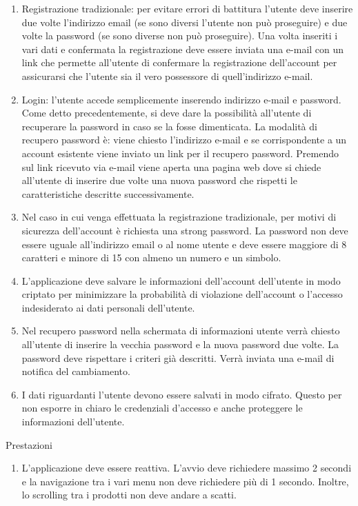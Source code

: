 \documentclass{article}
\begin{document}
\begin{enumerate}
    \item Registrazione tradizionale: per evitare errori di battitura l’utente deve inserire due volte l’indirizzo email (se sono diversi
        l’utente non può proseguire) e due volte la password (se sono diverse non può proseguire). Una volta inseriti i vari dati e confermata
        la registrazione deve essere inviata una e-mail con un link che permette all’utente di confermare la registrazione dell’account per
        assicurarsi che l'utente sia il vero possessore di quell'indirizzo e-mail.
    \item Login: l'utente accede semplicemente inserendo indirizzo e-mail e password. Come detto precedentemente, si deve dare la possibilità
        all'utente di recuperare la password in caso se la fosse dimenticata. La modalità di recupero password è: viene chiesto l’indirizzo
        e-mail e se corrispondente a un account esistente viene inviato un link per il recupero password. Premendo sul link ricevuto via
        e-mail viene aperta una pagina web dove si chiede all'utente di inserire due volte una nuova password che rispetti le caratteristiche
        descritte successivamente.
   \item Nel caso in cui venga effettuata la registrazione tradizionale, per motivi di sicurezza dell’account è richiesta una strong password.
        La password non deve essere uguale all’indirizzo email o al nome utente e deve essere maggiore di 8 caratteri e minore di 15 con
        almeno un numero e un simbolo.
   \item L'applicazione deve salvare le informazioni dell’account dell’utente in modo criptato per minimizzare la probabilità di violazione
        dell’account o l’accesso indesiderato ai dati personali dell’utente.
   \item Nel recupero password nella schermata di informazioni utente verrà chiesto all'utente di inserire la vecchia password e la nuova
        password due volte. La password deve rispettare i criteri già descritti. Verrà inviata una e-mail di notifica del cambiamento.
   \item {\color{red}I dati riguardanti l'utente devono essere salvati in modo cifrato. Questo per non esporre in chiaro le credenziali d'accesso e anche proteggere le informazioni dell'utente.}
\end{enumerate}
Prestazioni
\begin{enumerate}
    \item L’applicazione deve essere reattiva. L’avvio deve richiedere massimo 2 secondi e la navigazione tra i vari menu non deve richiedere più
            di 1 secondo. Inoltre, lo scrolling tra i prodotti non deve andare a scatti.
\end{enumerate}
\end{document}
